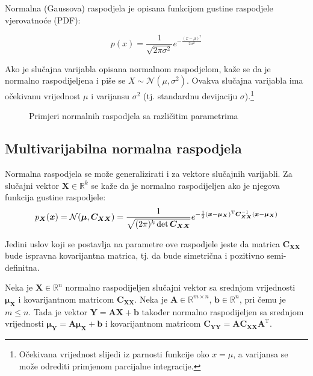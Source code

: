 \newcommand*{\vecrow}[2]{\left[\begin{array}{cc}#1&#2\end{array}\right]}
\newcommand*{\veccol}[2]{\left[\begin{array}{c}#1\\#2\end{array}\right]}

Normalna (Gaussova) raspodjela je opisana funkcijom gustine raspodjele
vjerovatnoće (PDF):

\begin{equation} \label{eq:normal}
  p(x) = \frac{1}{\sqrt{2\pi\sigma^2}} e^{-\frac{(x-\mu)^2}{2\sigma^2}}
\end{equation}

Ako je slučajna varijabla opisana normalnom raspodjelom, kaže se da je normalno
raspodijeljena i piše se $X \sim \mathcal{N}(\mu,\sigma^2)$. Ovakva slučajna
varijabla ima očekivanu vrijednost $\mu$ i varijansu $\sigma^2$ (tj. standardnu
devijaciju $\sigma$).\footnote{Očekivana vrijednost slijedi iz parnosti funkcije
oko $x=\mu$, a varijansa se može odrediti primjenom parcijalne integracije.}

\begin{figure}[h]
  \centering
	\caption{Primjeri normalnih raspodjela sa različitim parametrima}
\end{figure}

\subsection{Multivarijabilna normalna raspodjela}

Normalna raspodjela se može generalizirati i za vektore slučajnih varijabli.
Za slučajni vektor $\bm X \in \mathbb{R}^k$ se kaže da je normalno
raspodijeljen ako je njegova funkcija gustine raspodjele:
%
$$p_{\bm X}(\bm x) = \mathcal{N}(\bm\mu,\bm C_{\bm X\bm X}) =
	\frac{1}{\sqrt{(2\pi)^k \det \bm C_{\bm X \bm X}}}
	e^{
		-\frac{1}{2}(\bm x - \bm\mu_{\bm X})^\text T
		\bm C_{\bm X \bm X}^{-1}
		(\bm x - \bm\mu_{\bm X})
 	 }$$

Jedini uslov koji se postavlja na parametre ove raspodjele jeste da matrica
$\bm C_{\bm X\bm X}$ bude ispravna kovarijantna matrica, tj. da bude simetrična
i pozitivno semi-definitna.

\begin{theorem}
	\label{th:lin-tr-gauss}
	Neka je $\bm X \in \mathbb{R}^n$ normalno raspodijeljen slučajni vektor sa
	srednjom vrijednosti $\bm\mu_{\bm X}$ i kovarijantnom matricom $\bm C_{\bm
	X\bm X}$. Neka je $\bm A \in \mathbb{R}^{m\times n}$, $\bm b \in
	\mathbb{R}^n$, pri čemu je $m\le n$. Tada je vektor $\bm Y = \bm A \bm X + \bm
	b$ također normalno raspodijeljen sa srednjom vrijednosti $\bm\mu_{\bm Y} =
	\bm A\bm\mu_{\bm X} + \bm b$ i kovarijantnom matricom $\bm C_{\bm Y\bm Y} =
	\bm A \bm C_{\bm X\bm X} \bm A^\mathrm T$.

\end{theorem}


